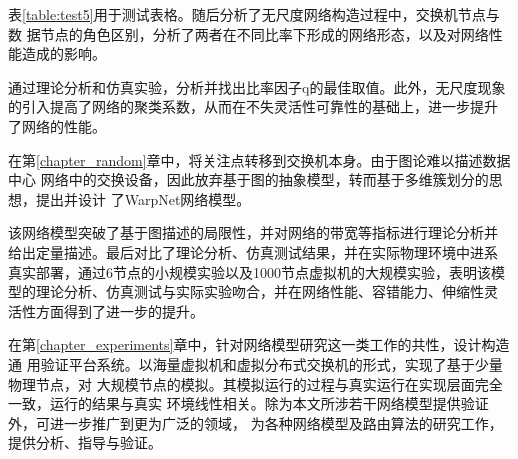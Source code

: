 表\ref{table:test5}用于测试表格。随后分析了无尺度网络构造过程中，交换机节点与数
据节点的角色区别，分析了两者在不同比率下形成的网络形态，以及对网络性能造成的影响。

通过理论分析和仿真实验，分析并找出比率因子q的最佳取值。此外，无尺度现象
的引入提高了网络的聚类系数，从而在不失灵活性可靠性的基础上，进一步提升
了网络的性能。

在第\ref{chapter_random}章中，将关注点转移到交换机本身。由于图论难以描述数据中心
网络中的交换设备，因此放弃基于图的抽象模型，转而基于多维簇划分的思想，提出并设计
了WarpNet网络模型。

该网络模型突破了基于图描述的局限性，并对网络的带宽等指标进行理论分析并
给出定量描述。最后对比了理论分析、仿真测试结果，并在实际物理环境中进系
真实部署，通过6节点的小规模实验以及1000节点虚拟机的大规模实验，表明该模
型的理论分析、仿真测试与实际实验吻合，并在网络性能、容错能力、伸缩性灵
活性方面得到了进一步的提升。

在第\ref{chapter_experiments}章中，针对网络模型研究这一类工作的共性，设计构造通
用验证平台系统。以海量虚拟机和虚拟分布式交换机的形式，实现了基于少量物理节点，对
大规模节点的模拟。其模拟运行的过程与真实运行在实现层面完全一致，运行的结果与真实
环境线性相关。除为本文所涉若干网络模型提供验证外，可进一步推广到更为广泛的领域，
为各种网络模型及路由算法的研究工作，提供分析、指导与验证。

\nocite{*}

%
%
